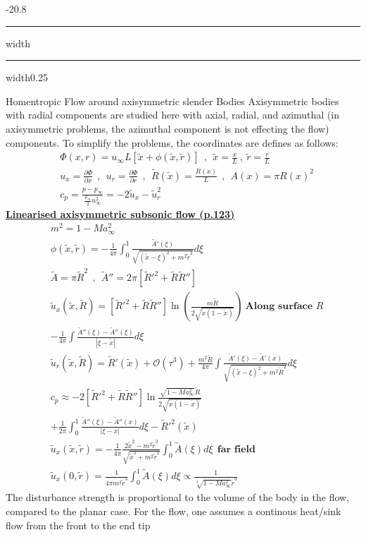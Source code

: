 \documentclass[8pt, landscape, fleqn]{scrartcl}
\makeatletter
\renewcommand{\section}{\@startsection{section}{1}{0mm}%
{-2\baselineskip}{0.8\baselineskip}%
{\hrule depth 0.2pt width\columnwidth\hrule depth1.5pt
width0.25\columnwidth\vspace*{1.2em}\Large\bfseries\rmfamily}}
\makeatother
\begin{document}
\begin{multicols*}{3}
\section{Homentropic Flow around axisymmetric slender Bodies}
Axisymmetric bodies with radial components are studied here with axial, radial, and azimuthal (in axisymmetric problems, the azimuthal component is not effecting the flow) components. To simplify the problems, the coordinates are defines as follows:
\begin{align*}
    &\Phi(x,r) = u_\infty L\left[ \tilde{x} + \phi(\tilde{x},\tilde{r}) \right]~~,~~ \tilde{x} = \frac{x}{L}~,~ \tilde{r} = \frac{r}{L} \\
    &u_x = \frac{\partial \Phi}{\partial x}~~,~~u_r = \frac{\partial \Phi }{\partial r}~~,~~\tilde{R}(\tilde{x}) = \frac{R(x)}{L}~~,~~A(x) = \pi R(x)^2 \\
    &c_p = \frac{p-p_\infty}{\frac{\rho_\infty}{2}u_\infty^2} = -2\tilde{u}_x - \tilde{u}_r^2
\end{align*}
\underline{\textbf{Linearised axisymmetric subsonic flow (p.123)}}\\
\begin{align*}
    &m^2 = 1 - Ma_\infty^2 \\
    &\phi(\tilde{x},\tilde{r}) = -\frac{1}{4\pi}\int_{0}^1 \frac{\tilde{A}'(\xi)}{\sqrt{(\tilde{x}-\xi)^2 + m^2 \tilde{r}^2}}d\xi \\
    &\tilde{A} = \pi \tilde{R}^2~~,~~\tilde{A}'' = 2 \pi \left[\tilde{R}'^2 + \tilde{R}\tilde{R}''\right] \\
    &\tilde{u}_x(\tilde{x},\tilde{R}) = \left[ \tilde{R}'^2 + \tilde{R}\tilde{R}'' \right] \ln \left( \frac{m\tilde{R}}{2\sqrt{\tilde{x}(1-\tilde{x})}}\right)~\textbf{Along surface $R$}\\ 
    & -\frac{1}{4\pi}\int \frac{\tilde{A}''(\xi)-\tilde{A}''(\xi)}{|\xi-\tilde{x}|} d\xi \\
    &\tilde{u}_r(\tilde{x},\tilde{R}) = \tilde{R}'(\tilde{x}) + \mathcal{O}(\tau^3)+\frac{m^2\tilde{R}}{4\pi}\int \frac{\tilde{A}'(\xi)-\tilde{A}'(x)}{\sqrt{(\tilde{x}-\xi)^2 + m^2\tilde{R}^2}}d\xi \\
    &c_p \approx -2\left[ \tilde{R}'^2 + \tilde{R}\tilde{R}'' \right] \ln \frac{\sqrt{1-Ma_\infty^2 }\tilde{R}}{2\sqrt{\tilde{x}(1-\tilde{x})}} \\
    &+\frac{1}{2\pi} \int_0^1 \frac{\tilde{A}''(\xi)-\tilde{A}''(x)}{|\xi-x|} d\xi - \tilde{R}'^2(\tilde{x}) \\
    &\tilde{u}_x(\tilde{x},\tilde{r}) = -\frac{1}{4\pi}\frac{2\tilde{x}^2-m^2\tilde{r}^2}{\sqrt{\tilde{x}^2+m^2\tilde{r}^2}}\int_0^1\tilde{A}(\xi)d\xi~~\textbf{far field} \\
    &\tilde{u}_x(0,\tilde{r})=\frac{1}{4\pi m^3\tilde{r}^3}\int_0^1 \tilde{A}(\xi)d\xi \propto \frac{1}{\sqrt[3]{1-Ma_\infty^2}\tilde{r}^3}
\end{align*}
The disturbance strength is proportional to the volume of the body in the flow, compared to the planar case. For the flow, one assumes a continous heat/sink flow from the front to the end tip \\


\end{multicols*}
\end{document}
